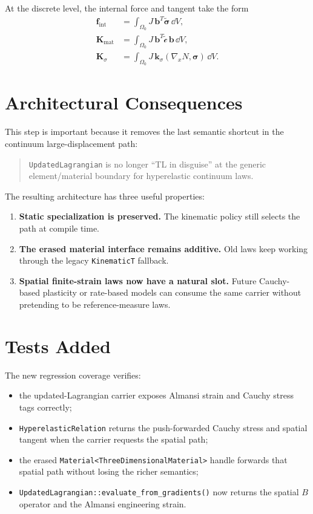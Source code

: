 At the discrete level, the internal force and tangent take the form
\begin{align}
  \mathbf{f}_{\text{int}}
    &= \int_{\Omega_0} J\, \mathbf{b}^T \tilde{\boldsymbol{\sigma}} \, \dd V, \\
  \mathbf{K}_{\text{mat}}
    &= \int_{\Omega_0} J\, \mathbf{b}^T \tilde{\mathcal{c}} \, \mathbf{b} \, \dd V, \\
  \mathbf{K}_{\sigma}
    &= \int_{\Omega_0} J\, \mathbf{k}_{\sigma}(\nabla_x N, \boldsymbol{\sigma}) \, \dd V.
\end{align}

\section{Architectural Consequences}

This step is important because it removes the last semantic shortcut in the
continuum large-displacement path:
\begin{quote}
\texttt{UpdatedLagrangian} is no longer ``TL in disguise'' at the generic
element/material boundary for hyperelastic continuum laws.
\end{quote}

The resulting architecture has three useful properties:
\begin{enumerate}
  \item \textbf{Static specialization is preserved.}
        The kinematic policy still selects the path at compile time.
  \item \textbf{The erased material interface remains additive.}
        Old laws keep working through the legacy \texttt{KinematicT} fallback.
  \item \textbf{Spatial finite-strain laws now have a natural slot.}
        Future Cauchy-based plasticity or rate-based models can consume the
        same carrier without pretending to be reference-measure laws.
\end{enumerate}

\section{Tests Added}

The new regression coverage verifies:
\begin{itemize}
  \item the updated-Lagrangian carrier exposes Almansi strain and Cauchy stress
        tags correctly;
  \item \texttt{HyperelasticRelation} returns the push-forwarded Cauchy stress
        and spatial tangent when the carrier requests the spatial path;
  \item the erased \texttt{Material<ThreeDimensionalMaterial>} handle forwards
        that spatial path without losing the richer semantics;
  \item \texttt{UpdatedLagrangian::evaluate\_from\_gradients()} now returns the
        spatial $B$ operator and the Almansi engineering strain.
\end{itemize}

